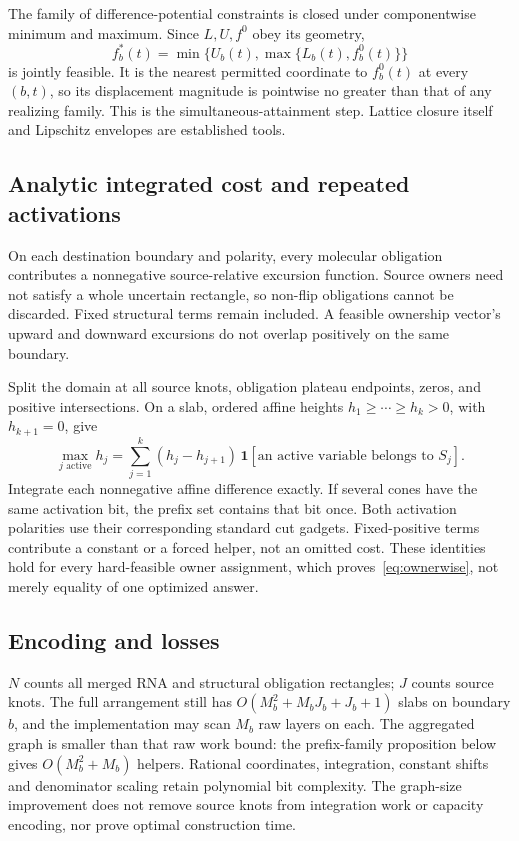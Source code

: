 \documentclass[10pt,letterpaper]{article}
\begin{document}
The family of difference-potential constraints is closed under componentwise minimum and maximum. Since $L,U,f^0$ obey its geometry,
\[
 f_b^*(t)=\min\{U_b(t),\max\{L_b(t),f_b^0(t)\}\}
\]
is jointly feasible. It is the nearest permitted coordinate to $f_b^0(t)$ at every $(b,t)$, so its displacement magnitude is pointwise no greater than that of any realizing family. This is the simultaneous-attainment step. Lattice closure itself and Lipschitz envelopes are established tools.

\subsection{Analytic integrated cost and repeated activations}
On each destination boundary and polarity, every molecular obligation contributes a nonnegative source-relative excursion function. Source owners need not satisfy a whole uncertain rectangle, so non-flip obligations cannot be discarded. Fixed structural terms remain included. A feasible ownership vector's upward and downward excursions do not overlap positively on the same boundary.

Split the domain at all source knots, obligation plateau endpoints, zeros, and positive intersections. On a slab, ordered affine heights $h_1\ge\cdots\ge h_k>0$, with $h_{k+1}=0$, give
\[
 \max_{j\text{ active}}h_j
 =\sum_{j=1}^k(h_j-h_{j+1})\,
       \mathbf1[\text{an active variable belongs to }S_j].
\]
Integrate each nonnegative affine difference exactly. If several cones have the same activation bit, the prefix set contains that bit once. Both activation polarities use their corresponding standard cut gadgets. Fixed-positive terms contribute a constant or a forced helper, not an omitted cost. These identities hold for every hard-feasible owner assignment, which proves~\eqref{eq:ownerwise}, not merely equality of one optimized answer.

\subsection{Encoding and losses}
$N$ counts all merged RNA and structural obligation rectangles; $J$ counts source knots. The full arrangement still has $O(M_b^2+M_bJ_b+J_b+1)$ slabs on boundary $b$, and the implementation may scan $M_b$ raw layers on each. The aggregated graph is smaller than that raw work bound: the prefix-family proposition below gives $O(M_b^2+M_b)$ helpers. Rational coordinates, integration, constant shifts and denominator scaling retain polynomial bit complexity. The graph-size improvement does not remove source knots from integration work or capacity encoding, nor prove optimal construction time.
\end{document}
